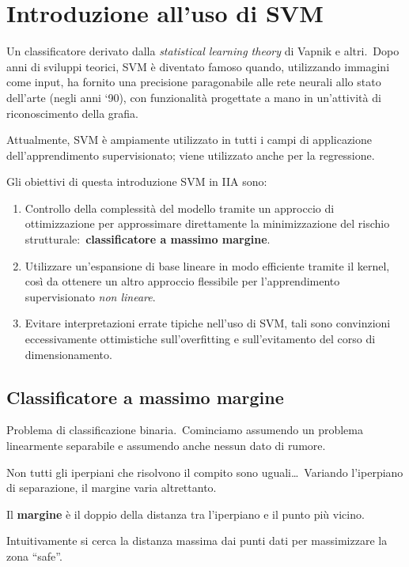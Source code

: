 \chapter{Introduzione all'uso di SVM}

Un classificatore derivato dalla \textit{statistical learning theory} di Vapnik e altri.\
Dopo anni di sviluppi teorici, SVM è diventato famoso quando, utilizzando immagini come input, ha fornito una precisione paragonabile alle rete neurali allo stato dell'arte (negli anni `90), con funzionalità progettate a mano in un'attività di riconoscimento della grafia.\

Attualmente, SVM è ampiamente utilizzato in tutti i campi di applicazione dell'apprendimento supervisionato; viene utilizzato anche per la regressione.\

Gli obiettivi di questa introduzione SVM in IIA sono:
\begin{enumerate}
	\item Controllo della complessità del modello tramite un approccio di ottimizzazione per approssimare direttamente la minimizzazione del rischio strutturale:\ \textbf{classificatore a massimo margine}.\
	\item Utilizzare un'espansione di base lineare in modo efficiente tramite il kernel, così da ottenere un altro approccio flessibile per l'apprendimento supervisionato \textit{non lineare}.
	\item Evitare interpretazioni errate tipiche nell'uso di SVM, tali sono convinzioni eccessivamente ottimistiche sull'overfitting e sull'evitamento del corso di dimensionamento.
\end{enumerate}

\section{Classificatore a massimo margine}

Problema di classificazione binaria.\
Cominciamo assumendo un problema linearmente separabile e assumendo anche nessun dato di rumore.

Non tutti gli iperpiani che risolvono il compito sono uguali\dots\
Variando l'iperpiano di separazione, il margine varia altrettanto.\

\begin{definition}
	Il \textbf{margine} è il doppio della distanza tra l'iperpiano e il punto più vicino.\
\end{definition}

\noindent Intuitivamente si cerca la distanza massima dai punti dati per massimizzare la zona ``safe''.\

